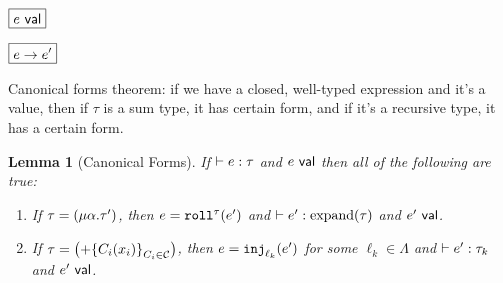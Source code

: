 \documentclass{article}
\DeclareMathOperator{\expand}{\text{\normalfont expand}}
\newtheorem{Lemma}[Theorem]{Lemma}
\begin{document}
$\boxed{\isval{e}}$

\begin{mathpar}

\end{mathpar}

\newpage

\noindent
$\boxed{e \smallstep e'}$

\begin{mathpar}





\end{mathpar}

Canonical forms theorem: if we have a closed, well-typed expression and it's a value,
then if $\tau$ is a sum type, it has certain form, and if it's a recursive type, it has a certain form.

\resetpfcounter
\begin{Lemma}[Canonical Forms]
  \label{thm:canonical forms}
  If $\hastype{e}{\tau}$
  and $\isval{e}$
  then all of the following are true:
  \begin{enumerate}
    \item
       If $\tau = \left( \rectype[\alpha][\tau'] \right)$,
     then $e = \roll{e'}$
      and $\hastype{e'}{\expand(\tau)}$
      and $\isval{e'}$.
    \item
       If $\tau = \left( \sumtype{C_i}{x_i}{C_i \in \C} \right)$,
     then $e = \inj[\ell_k]{e'}$ for some $\ell_k \in \Lambda$
      and $\hastype{e'}{\tau_k}$
      and $\isval{e'}$.
  \end{enumerate}
\end{Lemma}
\end{document}
